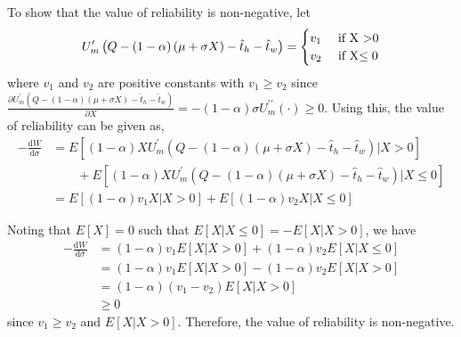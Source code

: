 \documentclass[12pt,a4paper,british]{article}
\makeatletter
\newenvironment{proof}[1][\proofname]{\par
    \normalfont\topsep6\p@\@plus6\p@\relax
    \trivlist
    \itemindent\parindent
    \item[\hskip\labelsep
          \scshape
      #1]\ignorespaces
  }{%
    \endtrivlist\@endpefalse
  }
\providecommand{\proofname}{Proof}
\makeatother
\begin{document}
\begin{proof}
To show that the value of reliability is non-negative, let
\begin{equation*}
U_{m}^{\prime}\left(Q-\left(1-\alpha\right)\left(\mu+\sigma X\right)-\hat{t}_{h}-\hat{t}_{w}\right)=\begin{cases}
v_{1} & \mbox{ if X >0}\\
v_{2} & \mbox{ if X\ensuremath{\leq0}}
\end{cases}
\end{equation*}%
where $v_{1}$ and $v_{2}$ are positive constants with $v_{1}\geq v_{2}$ since $\frac{\partial U_{m}^{\prime}\left(Q-\left(1-\alpha\right)\left(\mu+\sigma X\right)-\hat{t}_{h}-\hat{t}_{w}\right)}{\partial X}=-\left(1-\alpha\right)\sigma U_{m}^{\prime\prime}\left(\cdot\right)\geq0$. Using this, the value of reliability can be given as,%
\begin{align*}
-\frac{\mathrm{d}W}{\mathrm{d}\sigma} & =E\left[\left(1-\alpha\right)XU_{m}^{\prime}\left(Q-\left(1-\alpha\right)\left(\mu+\sigma X\right)-\hat{t}_{h}-\hat{t}_{w}\right)\vert X>0\right]\\
 & \qquad+E\left[\left(1-\alpha\right)XU_{m}^{\prime}\left(Q-\left(1-\alpha\right)\left(\mu+\sigma X\right)-\hat{t}_{h}-\hat{t}_{w}\right)\vert X\leq0\right]\\
 & =E\left[\left(1-\alpha\right)v_{1}X\vert X>0\right]+E\left[\left(1-\alpha\right)v_{2}X\vert X\leq0\right]
\end{align*}

Noting that $E\left[X\right]=0$ such that $E\left[X\vert X\leq0\right]=-E\left[X\vert X>0\right]$, we have
\begin{align*}
-\frac{\mathrm{d}W}{\mathrm{d}\sigma} & =\left(1-\alpha\right)v_{1}E\left[X\vert X>0\right]+\left(1-\alpha\right)v_{2}E\left[X\vert X\leq0\right]\\
 & =\left(1-\alpha\right)v_{1}E\left[X\vert X>0\right]-\left(1-\alpha\right)v_{2}E\left[X\vert X>0\right]\\
 & =\left(1-\alpha\right)\left(v_{1}-v_{2}\right)E\left[X\vert X>0\right]\\
 & \geq0
\end{align*}
since $v_{1}\geq v_{2}$ and $E\left[X\vert X>0\right]$. Therefore, the value of reliability is non-negative.


\end{proof}
\end{document}
